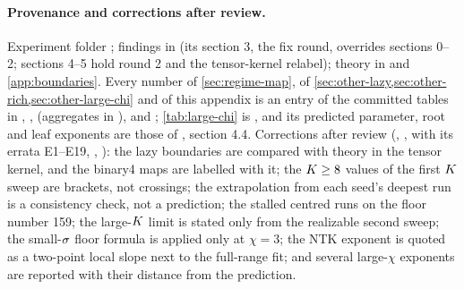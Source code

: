 \paragraph{Provenance and corrections after review.}
Experiment folder ; findings in  (its section 3, the fix
round, overrides sections 0--2; sections 4--5 hold round 2 and the tensor-kernel relabel); theory in
 and \cref{app:boundaries}. Every number of \cref{sec:regime-map}, of
\cref{sec:other-lazy,sec:other-rich,sec:other-large-chi} and of this appendix is an entry of the committed tables in
, ,  (aggregates in ),
 and ; \cref{tab:large-chi} is
, and its predicted parameter, root and leaf exponents are those of
, section 4.4. Corrections after review (,
,  with its errata E1--E19,
, ): the
lazy boundaries are compared with theory in the tensor kernel, and the binary4 maps are labelled with it; the
$K\ge8$ values of the first $K$ sweep are brackets, not crossings; the extrapolation from each seed's deepest
run is a consistency check, not a prediction; the stalled centred runs on the floor number 159; the large-$K$
limit is stated only from the realizable second sweep; the small-$\sigma$ floor formula is applied only at $\chi=3$;
the NTK exponent is quoted as a two-point local slope next to the full-range fit; and several large-$\chi$
exponents are reported with their distance from the prediction.
